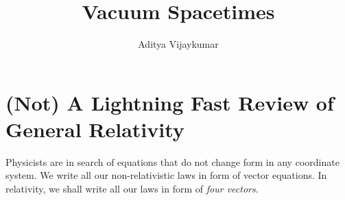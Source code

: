 \documentclass[a4paper,11pt]{article}
\title{\textbf{Vacuum Spacetimes}}
\author{Aditya Vijaykumar}
\affiliation{International Centre for Theoretical Sciences, Bengaluru, India.}
\begin{document}
\maketitle
\section{(Not) A Lightning Fast Review of General Relativity}

Physicists are in search of equations that do not change form in any coordinate system. We write all our non-relativistic laws in form of vector equations. In relativity, we shall write all our laws in form of \textit{four vectors}.
\end{document}
